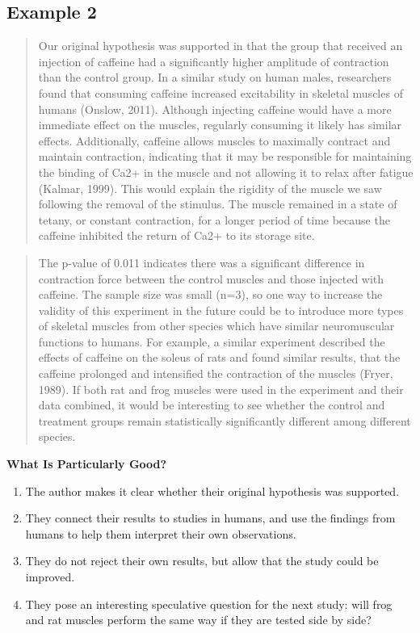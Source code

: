 \documentclass[
]{book}
\providecommand{\tightlist}{%
  \setlength{\itemsep}{0pt}\setlength{\parskip}{0pt}}
\begin{document}
\hypertarget{example-2-9}{%
\subsection{Example 2}\label{example-2-9}}

\begin{quote}
Our original hypothesis was supported in that the group that received an injection of caffeine had a significantly higher amplitude of contraction than the control group. In a similar study on human males, researchers found that consuming caffeine increased excitability in skeletal muscles of humans (Onslow, 2011). Although injecting caffeine would have a more immediate effect on the muscles, regularly consuming it likely has similar effects. Additionally, caffeine allows muscles to maximally contract and maintain contraction, indicating that it may be responsible for maintaining the binding of Ca2+ in the muscle and not allowing it to relax after fatigue (Kalmar, 1999). This would explain the rigidity of the muscle we saw following the removal of the stimulus. The muscle remained in a state of tetany, or constant contraction, for a longer period of time because the caffeine inhibited the return of Ca2+ to its storage site.
\end{quote}

\begin{quote}
The p-value of 0.011 indicates there was a significant difference in contraction force between the control muscles and those injected with caffeine. The sample size was small (n=3), so one way to increase the validity of this experiment in the future could be to introduce more types of skeletal muscles from other species which have similar neuromuscular functions to humans. For example, a similar experiment described the effects of caffeine on the soleus of rats and found similar results, that the caffeine prolonged and intensified the contraction of the muscles (Fryer, 1989). If both rat and frog muscles were used in the experiment and their data combined, it would be interesting to see whether the control and treatment groups remain statistically significantly different among different species.
\end{quote}

\textbf{What Is Particularly Good?}

\begin{enumerate}
\def\labelenumi{\arabic{enumi}.}
\tightlist
\item
  The author makes it clear whether their original hypothesis was supported.
\item
  They connect their results to studies in humans, and use the findings from humans to help them interpret their own observations.
\item
  They do not reject their own results, but allow that the study could be improved.
\item
  They pose an interesting speculative question for the next study: will frog and rat muscles perform the same way if they are tested side by side?
\end{enumerate}
\end{document}
